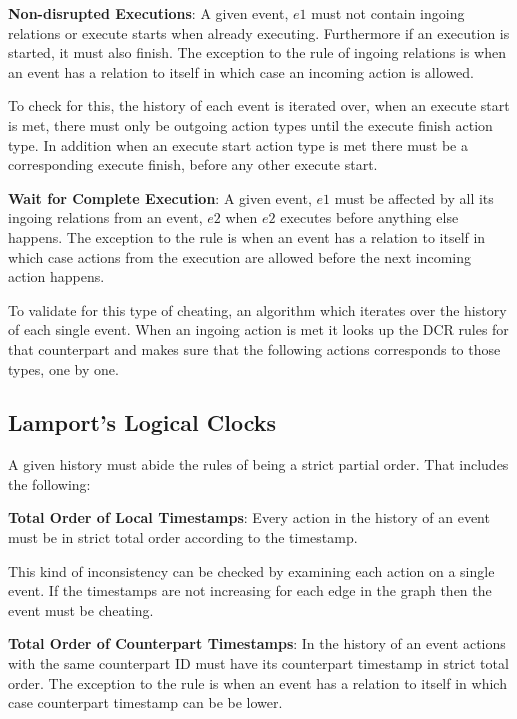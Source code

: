 	\newpar \textbf{Non-disrupted Executions}: A given event, $e1$ must not contain ingoing relations or execute starts when already executing. Furthermore if an execution is started, it must also finish. The exception to the rule of ingoing relations is when an event has a relation to itself in which case an incoming action is allowed.
	
	To check for this, the history of each event is iterated over, when an execute start is met, there must only be outgoing action types until the execute finish action type. In addition when an execute start action type is met there must be a corresponding execute finish, before any other execute start.
	
	\newpar \textbf{Wait for Complete Execution}: A given event, $e1$ must be affected by all its ingoing relations from an event, $e2$ when $e2$ executes before anything else happens. The exception to the rule is when an event has a relation to itself in which case actions from the execution are allowed before the next incoming action happens. 
	
	To validate for this type of cheating, an algorithm which iterates over the history of each single event. When an ingoing action is met it looks up the DCR rules for that counterpart and makes sure that the following actions corresponds to those types, one by one.
	\subsection{Lamport's Logical Clocks}
	A given history must abide the rules of being a strict partial order. That includes the following:
	
	\newpar \textbf{Total Order of Local Timestamps}: Every action in the history of an event must be in strict total order according to the timestamp.
	
	This kind of inconsistency can be checked by examining each action on a single event. If the timestamps are not increasing for each edge in the graph then the event must be cheating. 
	
	\newpar \textbf{Total Order of Counterpart Timestamps}: In the history of an event actions with the same counterpart ID must have its counterpart timestamp in strict total order.  The exception to the rule is when an event has a relation to itself in which case counterpart timestamp can be be lower.
	
